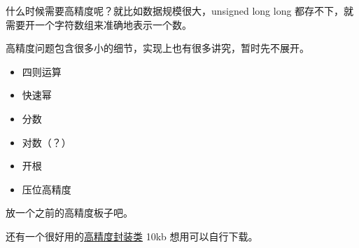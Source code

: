 
什么时候需要高精度呢？就比如数据规模很大，unsigned long long 都存不下，就需要开一个字符数组来准确地表示一个数。

高精度问题包含很多小的细节，实现上也有很多讲究，暂时先不展开。

\begin{itemize}
\item 四则运算
\item 快速幂
\item 分数
\item 对数（？）
\item 开根
\item 压位高精度
\end{itemize}

放一个之前的高精度板子吧。

还有一个很好用的\href{https://paste.ubuntu.com/p/7VKYzpC7dn/}{高精度封装类} 10kb 想用可以自行下载。

